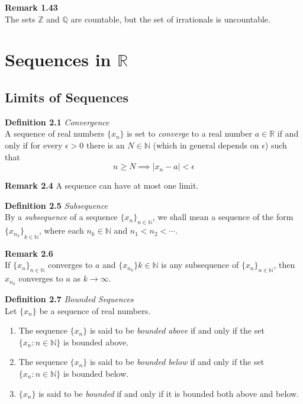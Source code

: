 \documentclass[8pt,landscape]{article}
\begin{document}
\begin{multicols}{3}
    \textbf{Remark 1.43} \\
    The sets $\mathbb{Z}$ and $\mathbb{Q}$ are countable, but the set of irrationals is
    uncountable.




    \section{Sequences in $\mathbb{R}$}

    \subsection{Limits of Sequences}



    \textbf{Definition 2.1} \emph{Convergence} \\
    A sequence of real numbers $\{ x_n \}$ is set to \emph{converge} to a real number
    $a \in \mathbb{R}$ if and only if for every $\epsilon > 0$ there is an
    $N \in \mathbb{N}$ (which in general depends on $\epsilon$) such that
    \[
        n \geq N \implies |x_n - a| < \epsilon
    \]

    \textbf{Remark 2.4}
    A sequence can have at most one limit.

    \textbf{Definition 2.5} \emph{Subsequence} \\
    By a \emph{subsequence} of a sequence ${\{x_n\}}_{n \in \mathbb{N}}$,
    we shall mean a sequence of the form ${\{x_{n_k}\}}_{k \in \mathbb{N}}$,
    where each $n_k \in \mathbb{N}$ and $n_1 < n_2 < \cdots$.

    \textbf{Remark 2.6} \\
    If ${ \{x_n\} }_{n \in \mathbb{N}}$ converges to $a$ and
    ${ \{x_n_k\} }{k \in \mathbb{N}}$ is any subsequence of
    ${ \{x_n\} }_{n \in \mathbb{N}}$, then $x_n_k$ converges to $a$ as $k \to \infty$.

    \textbf{Definition 2.7} \emph{Bounded Sequences} \\
    Let $\{ x_n \}$ be a sequence of real numbers.
    \begin{enumerate}
        \item The sequence $\{ x_n \}$ is said to be \emph{bounded above} if and only if
            the set $ \{ x_n : n \in \mathbb{N} \}$ is bounded above.
        \item The sequence $\{ x_n \}$ is said to be \emph{bounded below} if and only if
            the set $\{ x_n : n \in \mathbb{N} \}$ is bounded below.
        \item $\{ x_n \}$ is said to be \emph{bounded} if and only if it is bounded both
            above and below.
    \end{enumerate}


\end{multicols}
\end{document}
